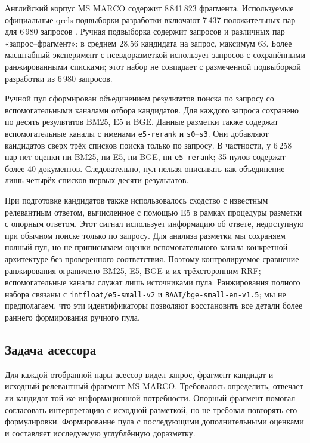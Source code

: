 \documentclass[runningheads,a4paper]{llncs}
\begin{document}
Английский корпус MS MARCO содержит 8\,841\,823 фрагмента. Используемые официальные qrels подвыборки разработки включают 7\,437 положительных пар для 6\,980 запросов \cite{msmarco_datasets}. Ручная подвыборка содержит \ManualQueryCount{} запросов и \ManualPairCount{} различных пар «запрос--фрагмент»: в среднем 28.56 кандидата на запрос, максимум 63. Более масштабный эксперимент с псевдоразметкой использует \FullQueryCount{} запросов с сохранёнными ранжированными списками; этот набор не совпадает с размеченной подвыборкой разработки из 6\,980 запросов.

Ручной пул сформирован объединением результатов поиска по запросу со вспомогательными каналами отбора кандидатов. Для каждого запроса сохранено по десять результатов BM25, E5 и BGE. Данные разметки также содержат вспомогательные каналы с именами \texttt{e5-rerank} и \texttt{s0}--\texttt{s3}. Они добавляют кандидатов сверх трёх списков поиска только по запросу. В частности, у 6\,258 пар нет оценки ни BM25, ни E5, ни BGE, ни \texttt{e5-rerank}; 35 пулов содержат более 40 документов. Следовательно, пул нельзя описывать как объединение лишь четырёх списков первых десяти результатов.

При подготовке кандидатов также использовалось сходство с известным релевантным ответом, вычисленное с помощью E5 в рамках процедуры разметки с опорным ответом. Этот сигнал использует информацию об ответе, недоступную при обычном поиске только по запросу. Для анализа разметки мы сохраняем полный пул, но не приписываем оценки вспомогательного канала конкретной архитектуре без проверенного соответствия. Поэтому контролируемое сравнение ранжирования ограничено BM25, E5, BGE и их трёхсторонним RRF; вспомогательные каналы служат лишь источниками пула. Ранжирования полного набора связаны с \texttt{intfloat/e5-small-v2} и \texttt{BAAI/bge-small-en-v1.5}; мы не предполагаем, что эти идентификаторы позволяют восстановить все детали более раннего формирования ручного пула.

\subsection{Задача асессора}
\label{sec:annotation}

Для каждой отобранной пары асессор видел запрос, фрагмент-кандидат и исходный релевантный фрагмент MS MARCO. Требовалось определить, отвечает ли кандидат той же информационной потребности. Опорный фрагмент помогал согласовать интерпретацию с исходной разметкой, но не требовал повторять его формулировки. Формирование пула с последующими дополнительными оценками и составляет исследуемую углублённую доразметку.
\end{document}
